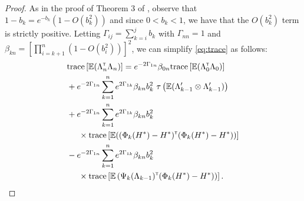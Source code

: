 \begin{proof}

 
As in the proof of Theorem 3 of \cite{spall-jacobian}, observe that $1-b_k = e^{-b_k}(1-O(b_k^2))$ and since $0 < b_k <1$, we have that the $O(b_k^2)$ term is strictly positive. 
Letting $\Gamma_{ij} = \sum_{k=i}^j b_k$ with $\Gamma_{nn} = 1$ and $\beta_{kn} = \left[\prod_{i=k+1}^n (1- O(b_i^2))\right]^2$, we can simplify \eqref{eq:trace} as follows:
\begin{align}\label{eq:wij}
 & \text{trace} \left[\E (\Lambda_n \tr \Lambda_n)\right] = e^{-2 \Gamma_{1n}} \beta_{0n} \text{trace} \left[\E (\Lambda_0 \tr \Lambda_0)\right]  \nonumber\\ &+ e^{-2 \Gamma_{1n}} \sum_{k=1}^n e^{2 \Gamma_{1k}} \beta_{kn} b_k^2  \,\,\tau\left(\E (\Lambda_{k-1}' \otimes \Lambda_{k-1}')\right)  \nonumber\\ &+ e^{-2 \Gamma_{1n}} \sum_{k=1}^n e^{2 \Gamma_{1k}} \beta_{kn} b_k^2  \nonumber\\&  \hspace{0.5cm}\times \text{trace}\left[\E ((\Phi_k(H^*) - H^*) \tr  (\Phi_k(H^*) - H^*))\right] \nonumber\\ &- e^{-2 \Gamma_{1n}} \sum_{k=1}^n e^{2 \Gamma_{1k}} \beta_{kn} b_k^2  \nonumber\\& \hspace{0.5cm} \times \text{trace} \left[\E\left(\Psi_k(\Lambda_{k-1}) \tr (\Phi_k(H^*) - H^*)\right)\right] .
 \end{align} 
 

\end{proof}
